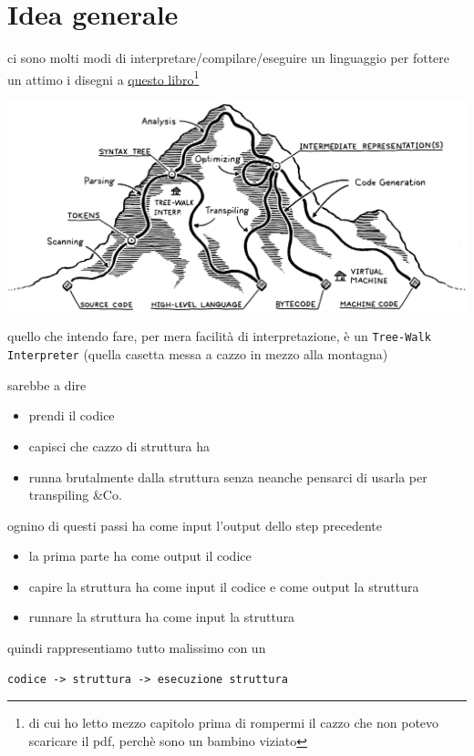 \documentclass[11pt]{article}
\author{Biggie Dickus}
\date{\today}
\title{}
\begin{document}
\tableofcontents

\section{Idea generale}
\label{sec:orgdc2c950}
ci sono molti modi di interpretare/compilare/eseguire un linguaggio per fottere un attimo i disegni a \href{https://craftinginterpreters.com/a-map-of-the-territory.html}{questo libro}\footnote{di cui ho letto mezzo capitolo prima di rompermi il cazzo che non potevo scaricare il pdf, perchè sono un bambino viziato}
\begin{center}
\includegraphics[width=.9\linewidth]{./mountain.png}
\end{center}
quello che intendo fare, per mera facilità di interpretazione, è un \texttt{Tree-Walk Interpreter} (quella casetta messa a cazzo in mezzo alla montagna)

sarebbe a dire
\begin{itemize}
\item prendi il codice
\item capisci che cazzo di struttura ha
\item runna brutalmente dalla struttura senza neanche pensarci di usarla per transpiling \&Co.
\end{itemize}

ognino di questi passi ha come input l'output dello step precedente
\begin{itemize}
\item la prima parte ha come output il codice
\item capire la struttura ha come input il codice e come output la struttura
\item runnare la struttura ha come input la struttura
\end{itemize}

quindi rappresentiamo tutto malissimo con un
\begin{verbatim}
codice -> struttura -> esecuzione struttura
\end{verbatim}
\end{document}
